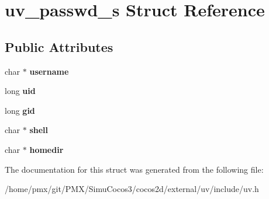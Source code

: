 \hypertarget{structuv__passwd__s}{}\section{uv\+\_\+passwd\+\_\+s Struct Reference}
\label{structuv__passwd__s}
\subsection*{Public Attributes}
\begin{DoxyCompactItemize}
\item 
\mbox{\label{structuv__passwd__s_a148fe33f75839e553a66b40635dd6d2c}} 
char $\ast$ {\bfseries username}
\item 
\mbox{\label{structuv__passwd__s_a690239e86ee194b849a2f6e12eb52bb2}} 
long {\bfseries uid}
\item 
\mbox{\label{structuv__passwd__s_abb82f829338e0ecd24b3812fc9b32853}} 
long {\bfseries gid}
\item 
\mbox{\label{structuv__passwd__s_af571c14a9c4023464e291a7936945686}} 
char $\ast$ {\bfseries shell}
\item 
\mbox{\label{structuv__passwd__s_a52c6d111766c85dccd9887ef5d8ccf35}} 
char $\ast$ {\bfseries homedir}
\end{DoxyCompactItemize}


The documentation for this struct was generated from the following file\+:\begin{DoxyCompactItemize}
\item 
/home/pmx/git/\+P\+M\+X/\+Simu\+Cocos3/cocos2d/external/uv/include/uv.\+h\end{DoxyCompactItemize}
